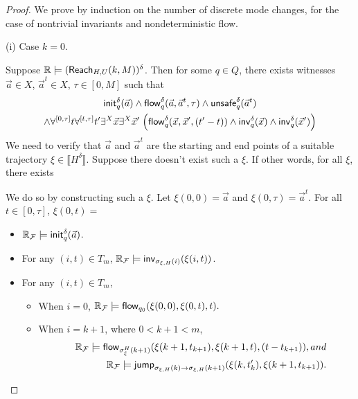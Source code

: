 \documentclass[journal]{IEEEtran}
\begin{document}
\begin{proof}
We prove by induction on the number of discrete mode changes, for the case of nontrivial invariants and nondeterministic flow.

(i) Case $k=0$.

Suppose $\mathbb{R}\models(\mathsf{Reach}_{H,U}(k,M))^{\delta}$. Then for some $q\in Q$, there exists witnesses $\vec a\in X$, $\vec a^t\in X$, $\tau\in [0,M]$ such that
\begin{multline*}
\mathsf{init}_q^{\delta}(\vec a)\wedge \mathsf{flow}_q^{\delta}(\vec a, \vec a^t, \tau)\wedge \mathsf{unsafe}_q^{\delta}(\vec a^t)\\
\wedge \forall^{[0,\tau]}t\forall^{[t,\tau]}t' \exists^X\vec x\exists^X\vec x'\;\Big(\mathsf{flow}_{q}^{\delta}(\vec x, \vec x',(t'-t))\wedge \mathsf{inv}_{q}^{\delta}(\vec x)\wedge \mathsf{inv}_{q}^{\delta}(\vec x')\Big)
\end{multline*}
We need to verify that $\vec a$ and $\vec a^t$ are the starting and end points of a suitable trajectory $\xi\in\llbracket H^{\delta}\rrbracket$. Suppose there doesn't exist such a $\xi$. If other words, for all $\xi$, there exists

We do so by constructing such a $\xi$. Let $\xi(0,0)= \vec a$ and $\xi(0,\tau) = \vec a^t$. For all $t\in [0,\tau]$, $\xi(0,t)=$
\begin{itemize}
\item $\mathbb{R}_{\mathcal{F}}\models \mathsf{init}_{q}^{\delta}(\vec a)$.
\item For any $(i, t)\in T_m$, $\mathbb{R}_{\mathcal{F}}\models \mathsf{inv}_{\sigma_{\xi,H}(i)} (\xi(i,t))$.
\item For any $(i,t)\in T_m$,
\begin{itemize}
\item When $i=0$, $\mathbb{R}_{\mathcal{F}}\models\mathsf{flow}_{q_0}(\xi(0,0), \xi(0,t), t).$
\item When $i = k+1$, where $0<k+1<m$,
\begin{eqnarray*}
& &\mathbb{R}_{\mathcal{F}}\models\mathsf{flow}_{\sigma^H_{\xi}(k+1)}(\xi(k+1, t_{k+1}), \xi(k+1, t), (t - t_{k+1})), and\\
& &\mathbb{R}_{\mathcal{F}}\models \mathsf{jump}_{\sigma_{\xi,H}(k)\rightarrow\sigma_{\xi,H}(k+1)}(\xi(k, t_k'), \xi(k+1,t_{k+1})).
\end{eqnarray*}
\end{itemize}
\end{itemize}
\end{proof}
\end{document}
